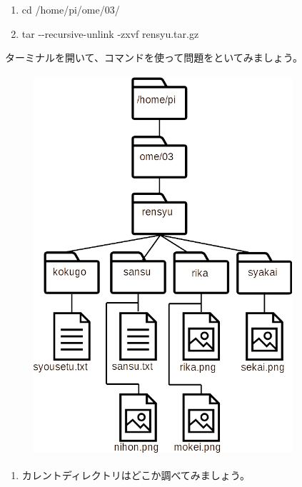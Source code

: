 \documentclass[a4paper,dvipdfmx]{jarticle}
\begin{document}
\begin{enumerate}
\item cd\textcolor[rgb]{1.0,0.2,0.2}{ }/home/pi/ome/03/
\item tar\textcolor[rgb]{1.0,0.2,0.2}{ }{}-{}-recursive-unlink {}-zxvf rensyu.tar.gz
\end{enumerate}

ターミナルを開いて、コマンドを使って問題をといてみましょう。

\begin{figure}
\centering
\includegraphics[width=9.585cm,height=14.088cm]{text03-img/text03-img029.png}
\end{figure}
\begin{enumerate}
\item
カレントディレクトリはどこか調べてみましょう。
\end{enumerate}

\bigskip


\bigskip
\end{document}
